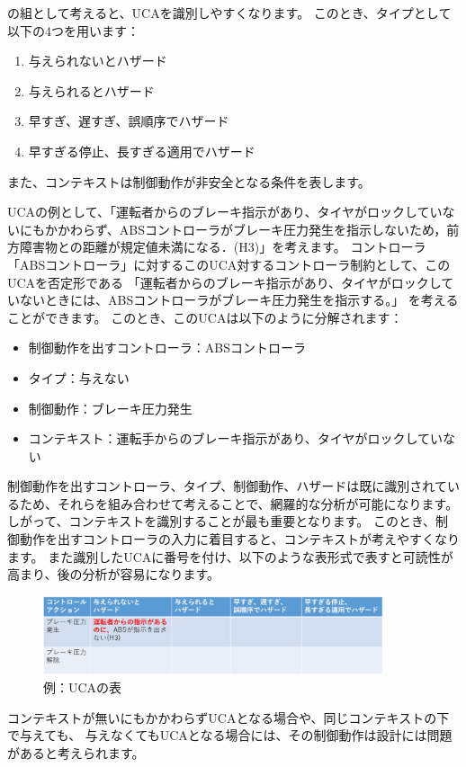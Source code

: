 の組として考えると、UCAを識別しやすくなります。
このとき、タイプとして以下の4つを用います：
%
\begin{enumerate}
    \item 与えられないとハザード
    \item 与えられるとハザード
    \item 早すぎ、遅すぎ、誤順序でハザード
    \item 早すぎる停止、長すぎる適用でハザード
\end{enumerate}
また、コンテキストは制御動作が非安全となる条件を表します。

UCAの例として、「運転者からのブレーキ指示があり、タイヤがロックしていないにもかかわらず、ABSコントローラがブレーキ圧力発生を指示しないため，前方障害物との距離が規定値未満になる．(H3)」を考えます。
コントローラ「ABSコントローラ」に対するこのUCA対するコントローラ制約として、このUCAを否定形である
「運転者からのブレーキ指示があり、タイヤがロックしていないときには、ABSコントローラがブレーキ圧力発生を指示する。」
を考えることができます。
このとき、このUCAは以下のように分解されます：
%
\begin{itemize}
    \item 制御動作を出すコントローラ：ABSコントローラ
    \item タイプ：与えない
    \item 制御動作：ブレーキ圧力発生
    \item コンテキスト：運転手からのブレーキ指示があり、タイヤがロックしていない
\end{itemize}
%
制御動作を出すコントローラ、タイプ、制御動作、ハザードは既に識別されているため、それらを組み合わせて考えることで、網羅的な分析が可能になります。
しがって、コンテキストを識別することが最も重要となります。
このとき、制御動作を出すコントローラの入力に着目すると、コンテキストが考えやすくなります。
また識別したUCAに番号を付け、以下のような表形式で表すと可読性が高まり、後の分析が容易になります。
%
\begin{figure}[H]
    \centering
    \includegraphics[width=100mm]{safety_assurance_contents/ch3images/fig-3-2-3-03.png}
    \caption[short]{例：UCAの表}
\end{figure}

コンテキストが無いにもかかわらずUCAとなる場合や、同じコンテキストの下で与えても、
与えなくてもUCAとなる場合には、その制御動作は設計には問題があると考えられます。

